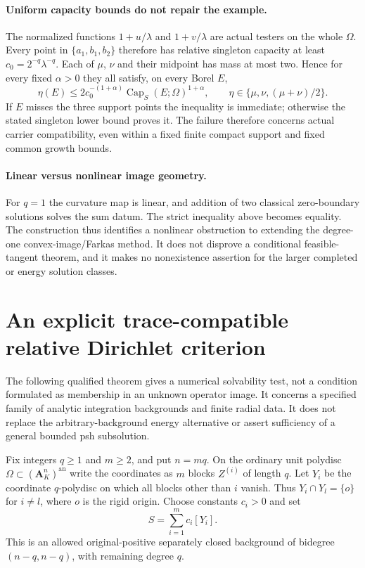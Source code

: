 \documentclass[11pt,a4paper]{article}
\numberwithin{equation}{section}
\theoremstyle{definition}
\theoremstyle{remark}
\newcommand{\an}{\mathrm{an}}
\begin{document}
\paragraph{Uniform capacity bounds do not repair the example.}
The normalized functions $1+u/\lambda$ and $1+v/\lambda$ are actual
testers on the whole $\Omega$. Every point in
$\{a_1,b_1,b_2\}$ therefore has relative singleton capacity at
least $c_0=2^{-q}\lambda^{-q}$. Each of $\mu$, $\nu$ and their
midpoint has mass at most two. Hence for every fixed $\alpha>0$
they all satisfy, on every Borel $E$,
\[
  \eta(E)\le2c_0^{-(1+\alpha)}
                    \operatorname{Cap}_S(E;\Omega)^{1+\alpha},
       \qquad\eta\in\{\mu,\nu,(\mu+\nu)/2\}.
\]
If $E$ misses the three support points the inequality is immediate;
otherwise the stated singleton lower bound proves it. The failure
therefore concerns actual carrier compatibility, even within a
fixed finite compact support and fixed common growth bounds.

\paragraph{Linear versus nonlinear image geometry.}
For $q=1$ the curvature map is linear, and addition of two classical
zero-boundary solutions solves the sum datum. The strict inequality
above becomes equality. The construction thus identifies a nonlinear
obstruction to extending the degree-one convex-image/Farkas method.
It does not disprove a conditional feasible-tangent theorem, and it
makes no nonexistence assertion for the larger completed or energy
solution classes.



\section{An explicit trace-compatible relative Dirichlet criterion}
\label{sec:r6-radial-carrier-criterion}

The following qualified theorem gives a numerical solvability test,
not a condition formulated as membership in an unknown operator image.
It concerns a specified family of analytic integration backgrounds and
finite radial data. It does not replace the arbitrary-background
energy alternative or assert sufficiency of a general bounded psh
subsolution.

Fix integers $q\ge1$ and $m\ge2$, and put $n=mq$. On the ordinary
unit polydisc $\Omega\subset(\mathbf A_K^n)^{\an}$ write the
coordinates as $m$ blocks $Z^{(i)}$ of length $q$. Let $Y_i$ be
the coordinate $q$-polydisc on which all blocks other than $i$ vanish.
Thus $Y_i\cap Y_l=\{o\}$ for $i\ne l$, where $o$ is the rigid
origin. Choose constants $c_i>0$ and set
\[
               S=\sum_{i=1}^m c_i[Y_i].
\]
This is an allowed original-positive separately closed background of
bidegree $(n-q,n-q)$, with remaining degree $q$.
\end{document}
